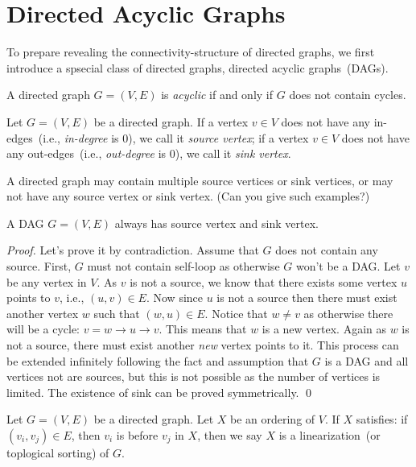 \setcounter{definition}{0} \setcounter{property}{0} \setcounter{claim}{0} \setcounter{fact}{0} \setcounter{corollary}{0} \setcounter{figure}{0}
\section{Directed Acyclic Graphs}

To prepare revealing the connectivity-structure of directed graphs, we first introduce
a spsecial class of directed graphs, directed acyclic graphs~(DAGs).

\begin{definition}[DAG]
A directed graph $G = (V, E)$ is \emph{acyclic} if and only if $G$ does not contain cycles.
\end{definition}

Let $G = (V, E)$ be a directed graph. 
If a vertex $v\in V$ does not have any in-edges~(i.e., \emph{in-degree} is 0), we call it \emph{source vertex};
if a vertex $v\in V$ does not have any out-edges~(i.e., \emph{out-degree} is 0), we call it \emph{sink vertex}.

A directed graph may contain multiple source vertices or sink vertices,
or may not have any source vertex or sink vertex. (Can you give such examples?)

\begin{claim}
A DAG $G=(V,E)$ always has source vertex and sink vertex.
\end{claim}
\emph{Proof.} Let's prove it by contradiction. Assume that $G$ does not contain any source.
First, $G$ must not contain self-loop as otherwise $G$ won't be a DAG.
Let $v$ be any vertex in $V$. As $v$ is not a source, we know that there exists some vertex $u$ points to $v$, i.e., $(u,v)\in E$.
Now since $u$ is not a source then there must exist another vertex $w$ such that $(w,u)\in E$.
Notice that $w \neq v$ as otherwise there will be a cycle: $v = w \to u \to v$.
This means that $w$ is a new vertex. Again as $w$ is not a source, there must exist another \emph{new} vertex points to it.
This process can be extended infinitely following the fact and assumption that $G$ is a DAG and all vertices not are sources,
but this is not possible as the number of vertices is limited. 
The existence of sink can be proved symmetrically. \qed


\begin{definition}
Let $G = (V,E)$ be a directed graph. Let $X$ be an ordering of $V$.
If $X$ satisfies: if $(v_i, v_j)\in E$, then $v_i$ is before $v_j$ in $X$,
then we say $X$ is a linearization~(or toplogical sorting) of $G$.
\end{definition}

